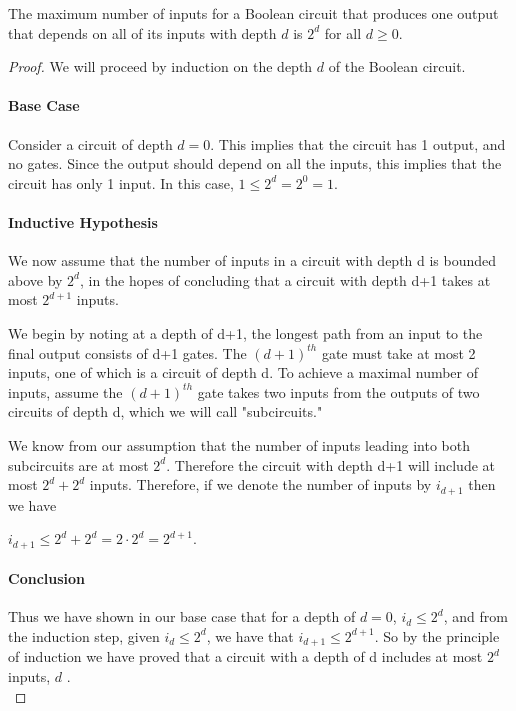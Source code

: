 \documentclass[11pt]{article}
\begin{document}
\begin{theorem}
The maximum number of inputs for a Boolean circuit that produces one output that depends on all of its inputs with depth $d$ is $2^{d}$ for all $d \ge 0$.
\end{theorem}


\begin{proof} We will proceed by induction on the depth $d$ of the Boolean circuit.

\paragraph{Base Case} Consider a circuit of depth $d = 0$. This implies that the circuit has 1 output, and no gates. Since the output should depend on all the inputs, this implies that the circuit has only 1 input. In this case, $1 \le 2^d = 2^0 = 1$.


\paragraph{Inductive Hypothesis} We now assume that the number of inputs in a circuit with depth d is bounded above by $2^{d}$, in the hopes of concluding that a circuit with depth d+1 takes at most $2^{d+1}$ inputs. 
\par We begin by noting at a depth of d+1, the longest path from an input to the final output consists of d+1 gates. The $(d+1)^{th}$ gate must take at most 2 inputs, one of which is a circuit of depth d. To achieve a maximal number of inputs, assume the $(d+1)^{th}$ gate takes two inputs from the outputs of two circuits of depth d, which we will call "subcircuits." 
\par We know from our assumption that the number of inputs leading into both subcircuits are at most $2^{d}$. Therefore the circuit with depth d+1 will include at most $2^{d} + 2^{d}$ inputs. Therefore, if we denote the number of inputs by $i_{d+1}$ then we have
\begin{center} 
 $i_{d+1} \leq 2^{d} + 2^{d} = 2 \cdot 2^{d} = 2^{d+1}$.
\end{center}

\paragraph{Conclusion}
Thus we have shown in our base case that for a depth of $d=0$, $i_{d} \leq 2^{d}$, and from the induction step, given $i_{d} \leq 2^{d}$, we have that $i_{d+1} \leq 2^{d+1}$. So by the principle of induction we have proved that a circuit with a depth of d includes at most $2^{d}$ inputs, \forall $d$ \in\N.
\\
\end{proof}
\end{document}

